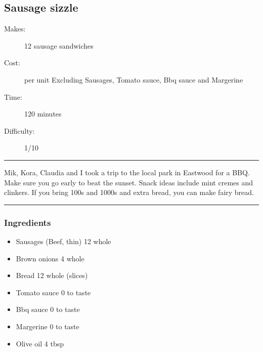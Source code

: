 \documentclass[]{article}
\begin{document}
\subsection*{\center\huge Sausage sizzle}
\begin{description}
\item[Makes:] 12 sausage sandwiches
\item[Cost:]  per unit Excluding Sausages, Tomato sauce, Bbq sauce and Margerine
\item[Time:] 120 minutes
\item[Difficulty:] 1/10
\end{description}
\vspace{0.2cm}\hrule\vspace{0.5cm}
\begin{adjustwidth}{0.5 cm}{0.5 cm}

Mik, Kora, Claudia and I took a trip to the local park in Eastwood for a BBQ. Make sure you go early to beat the sunset. Snack ideas include mint cremes and clinkers. If you bring 100s and 1000s and extra bread, you can make fairy bread. \hfill{}\color{black}

\end{adjustwidth}
\vspace{0.5cm}\hrule
\subsubsection*{\Large Ingredients}
\begin{multicols}{2}
\begin{itemize}
 \item Sausages (Beef, thin) \hfill 12 whole
 \item Brown onions \hfill 4 whole
 \item Bread \hfill 12 whole (slices)
 \item Tomato sauce \hfill 0 to taste
 \item Bbq sauce \hfill 0 to taste
 \item Margerine \hfill 0 to taste
 \item Olive oil \hfill 4 tbsp
\end{itemize}
\end{multicols}
\end{document}
